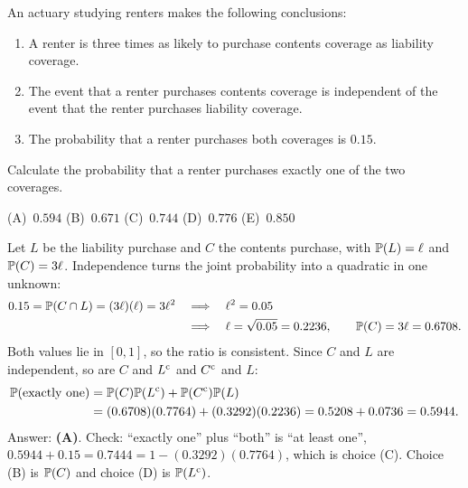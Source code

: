 \begin{example}
An actuary studying renters makes the following conclusions:
\begin{enumerate}[label=(\roman*),nosep]
\item A renter is three times as likely to purchase contents coverage as liability coverage.
\item The event that a renter purchases contents coverage is independent of the event that the renter purchases liability coverage.
\item The probability that a renter purchases both coverages is $0.15$.
\end{enumerate}
Calculate the probability that a renter purchases exactly one of the two coverages.

\begin{center}
(A)~$0.594$ \quad (B)~$0.671$ \quad (C)~$0.744$ \quad (D)~$0.776$ \quad (E)~$0.850$
\end{center}
\end{example}
\begin{solution}
Let $L$ be the liability purchase and $C$ the contents purchase, with $\mathbb{P}(L) = \ell$ and $\mathbb{P}(C) = 3\ell$. Independence turns the joint probability into a quadratic in one unknown:
\begin{align*}
0.15 = \mathbb{P}(C \cap L) = (3\ell)(\ell) = 3\ell^2 \quad&\Longrightarrow\quad \ell^2 = 0.05 \\
&\Longrightarrow\quad \ell = \sqrt{0.05} = 0.2236, \qquad \mathbb{P}(C) = 3\ell = 0.6708.
\end{align*}
Both values lie in $[0,1]$, so the ratio is consistent. Since $C$ and $L$ are independent, so are $C$ and $L^{\mathrm{c}}$ and $C^{\mathrm{c}}$ and $L$:
\begin{align*}
\mathbb{P}(\text{exactly one}) &= \mathbb{P}(C)\mathbb{P}(L^{\mathrm{c}}) + \mathbb{P}(C^{\mathrm{c}})\mathbb{P}(L) \\
&= (0.6708)(0.7764) + (0.3292)(0.2236) = 0.5208 + 0.0736 = 0.5944.
\end{align*}
Answer: \textbf{(A)}. Check: ``exactly one'' plus ``both'' is ``at least one'', $0.5944 + 0.15 = 0.7444 = 1 - (0.3292)(0.7764)$, which is choice (C). Choice (B) is $\mathbb{P}(C)$ and choice (D) is $\mathbb{P}(L^{\mathrm{c}})$.
\end{solution}

